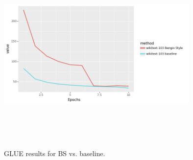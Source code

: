 \begin{figure}[h]
\centering
\includegraphics[width=10cm, height=10cm]{Thesis/images/wikitext-103BS.png}
\caption{GLUE results for BS vs. baseline.}
\end{figure}
